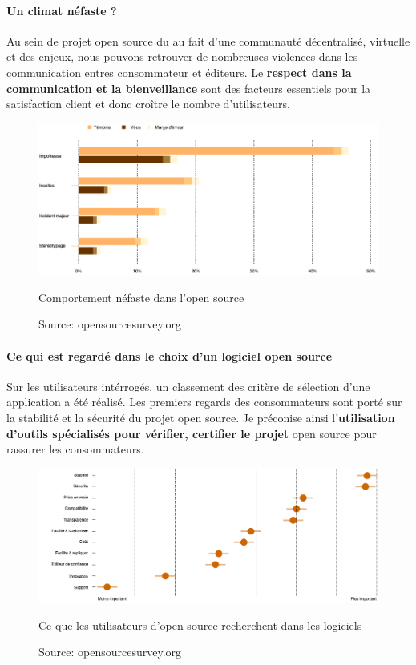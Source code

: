 			\paragraph{Un climat néfaste ?\\}

				Au sein de projet open source du au fait d'une communauté décentralisé, virtuelle et des enjeux, nous pouvons retrouver de nombreuses violences dans les communication entres consommateur et éditeurs. Le \textbf{respect dans la communication et la bienveillance} sont des facteurs essentiels pour la satisfaction client et donc croître le nombre d'utilisateurs.

				\begin{figure}[!htb]
					\center
					\includegraphics[scale=0.50]{./img/ng_behaviour_os.png}
					\caption{Comportement néfaste dans l'open source}
   					\caption*{\color{silver}Source: opensourcesurvey.org}
				\end{figure}

			\paragraph{Ce qui est regardé dans le choix d'un logiciel open source\\}

				Sur les utilisateurs intérrogés, un classement des critère de sélection d'une application a été réalisé. Les premiers regards des consommateurs sont porté sur la stabilité et la sécurité du projet open source. Je préconise ainsi l'\textbf{utilisation d'outils spécialisés pour vérifier, certifier le projet} open source pour rassurer les consommateurs.

				\begin{figure}[!htb]
					\center
					\includegraphics[scale=0.50]{./img/value_soft_os.png}
					\caption{Ce que les utilisateurs d'open source recherchent dans les logiciels}
   					\caption*{\color{silver}Source: opensourcesurvey.org}
				\end{figure}


